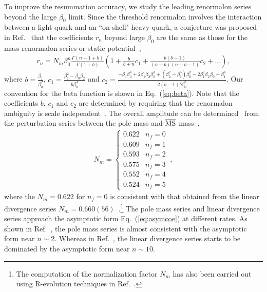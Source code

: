 \documentclass[a4paper,11pt]{article}
\begin{document}
To improve the resummation accuracy, we study the leading renormalon series beyond the large $\beta_0$ limit. Since the threshold renormalon involves the interaction between a light quark and an ``on-shell" heavy quark, a conjecture was proposed in Ref.~\cite{Liu:2023onm} that the coefficients $r_n$ beyond large $\beta_0$ are the same as those for the mass renormalon series or static potential~\cite{Beneke:1994rs,Pineda:2001zq,Pineda:2002se,Bali:2013pla,Ayala:2014yxa},
\begin{align}\label{eq:asymcoe}
r_{n} = N_m \beta_0^n \frac{\Gamma(n+1+b)}{\Gamma(1+b)} \left( 1+ \frac{b}{b+n} c_1 + \frac{b(b-1)}{(n+b)(n+b-1)} c_2 + ...\right),
\end{align}
where $b = \frac{\beta_1}{\beta_0^2}$, $c_1 = \frac{\beta_1^2 - \beta_0 \beta_2}{b \beta_0^4}$ and $c_2 = \frac{-\beta _3 \beta _0^4+2 \beta _1 \beta _2 \beta _0^3+\left(\beta _2^2-\beta _1^3\right)\beta _0^2-2 \beta _1^2 \beta _2 \beta _0+\beta _1^4}{2 (b-1) b \beta _0^8}$. Our convention for the beta function is shown in Eq.~(\ref{eq:beta}). Note that the coefficients $b$, $c_1$ and $c_2$ are determined by requiring that the renormalon ambiguity is scale independent~\cite{Beneke:1994rs}. The overall amplitude can be determined~\cite{Pineda:2001zq} from the perturbation series between the pole mass and $\overline{\rm MS}$ mass~\cite{Melnikov:2000qh},
\begin{align}
    N_m = 
    \begin{cases}
        0.622 & n_f = 0 \\
        0.609 & n_f = 1 \\
        0.593 & n_f = 2 \\
        0.575 & n_f = 3 \\
        0.552 & n_f = 4 \\
        0.524 & n_f = 5 
    \end{cases} \ ,
\end{align}
where the $N_m=0.622$ for $n_f=0$ is consistent with that obtained from the linear divergence series $N_m = 0.660(56)$~\cite{Bali:2013pla}.\footnote{The computation of the normalization factor $N_m$ has also been carried out using R-evolution techniques in Ref.~\cite{Hoang:2017suc}.} The pole mass series and linear divergence series approach the asymptotic form Eq.~(\ref{eq:asymcoe}) at different rates. As shown in Ref.~\cite{Pineda:2001zq}, the pole mass series is almost consistent with the asymptotic form near $n \sim 2$. Whereas in Ref.~\cite{Bali:2013pla}, the linear divergence series starts to be dominated by the asymptotic form near $n \sim 10$. 
\end{document}
